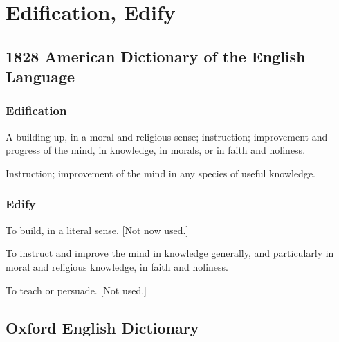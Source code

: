 \section{Edification, Edify}
	\label{EDIFICATION}
	

\subsection{1828 American Dictionary of the English Language} %
	\label{EDIFICATION-1828}
	
	\subsubsection{Edification}

		\begin{compactitem}
			\item[1] A building up, in a moral and religious sense; instruction; improvement and progress of the mind, in knowledge, in morals, or in faith and holiness.
			\item[2] Instruction; improvement of the mind in any species of useful knowledge.
		\end{compactitem}
		
	\subsubsection{Edify}

		\begin{compactitem}
			\item[1] To build, in a literal sense. [Not now used.]
			\item[2] To instruct and improve the mind in knowledge generally, and particularly in moral and religious knowledge, in faith and holiness.
			\item[3] To teach or persuade. [Not used.]
		\end{compactitem}

\subsection{Oxford English Dictionary} %
	\label{EDIFICATION-OED}
	
